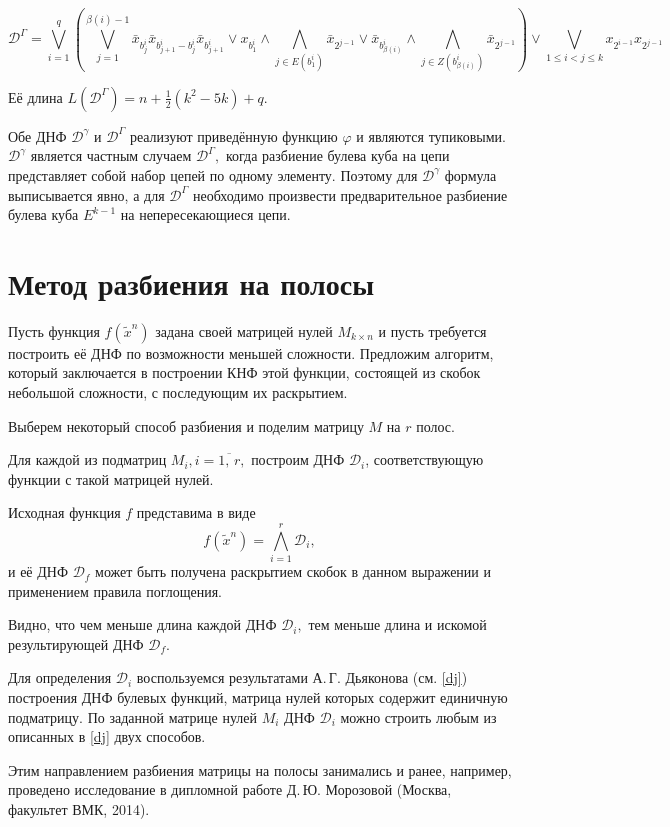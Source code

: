 \documentclass[12pt,a4paper,oneside,fleqn,leqno]{article}
\theoremstyle{definition}
\begin{document}
			$$
				\mathcal{D}^{\Gamma} = \bigvee_{i = 1}^q \left(\bigvee_{j = 1}^{\beta(i) - 1} \bar{x}_{b_j^i} \bar{x}_{b_{j + 1}^i - b_j^i} \bar{x}_{b_{j + 1}^i} \vee x_{b_1^i} \wedge \bigwedge_{j \in E(b_1^i)}\bar{x}_{2^{j - 1}} \vee \bar{x}_{b^i_{\beta(i)}} \wedge \bigwedge_{j \in Z(b^i_{\beta(i)})}\bar{x}_{2^{j - 1}} \right)
				 \vee \bigvee_{1 \leqslant i < j \leqslant k} x_{2^{i - 1}} x_{2^{j - 1}}
			$$\par
			Её длина $L(\mathcal{D}^{\Gamma}) = n + \frac{1}{2}(k^2 - 5k) + q.$\par
			Обе ДНФ $\mathcal{D}^{\gamma}$ и $\mathcal{D}^{\Gamma}$ реализуют приведённую функцию $\varphi$ и являются тупиковыми. $\mathcal{D}^{\gamma}$ является частным случаем $\mathcal{D}^{\Gamma},$ когда разбиение булева куба на цепи представляет собой набор цепей по одному элементу. Поэтому для $\mathcal{D}^{\gamma}$ формула выписывается явно, а для $\mathcal{D}^{\Gamma}$ необходимо произвести предварительное разбиение булева куба $E^{k - 1}$ на непересекающиеся цепи.\par
	\newpage
	\section{Метод разбиения на полосы}
		Пусть функция $f(\tilde x^n)$ задана своей матрицей нулей $M_{k \times n}$ и пусть требуется построить её ДНФ по возможности меньшей сложности. Предложим алгоритм, который заключается в построении КНФ этой функции, состоящей из скобок небольшой сложности, с последующим их раскрытием.\par
		Выберем некоторый способ разбиения и поделим матрицу $M$ на $r$ полос.\par
		Для каждой из подматриц $M_i, i = \overline{1,\,r},$ построим ДНФ $\mathcal{D}_i$, соответствующую функции с такой матрицей нулей.\par
		Исходная функция $f$ представима в виде
		$$
			f(\tilde x^n) = \bigwedge_{i = 1}^r \mathcal{D}_i,
		$$
		и её ДНФ $\mathcal{D}_f$ может быть получена раскрытием скобок в данном выражении и применением правила поглощения.\par
		Видно, что чем меньше длина каждой ДНФ $\mathcal{D}_i,$ тем меньше длина и искомой результирующей ДНФ $\mathcal{D}_f.$\par
		Для определения $\mathcal{D}_i$ воспользуемся результатами А.\,Г. Дьяконова (см. \ref{dj}) построения ДНФ булевых функций, матрица нулей которых содержит единичную подматрицу. По заданной матрице нулей $M_i$ ДНФ $\mathcal{D}_i$ можно строить любым из описанных в \ref{dj} двух способов.\par
		Этим направлением разбиения матрицы на полосы занимались и ранее, например, проведено исследование в дипломной работе Д.\,Ю. Морозовой (Москва, факультет ВМК, 2014).\par
\end{document}
